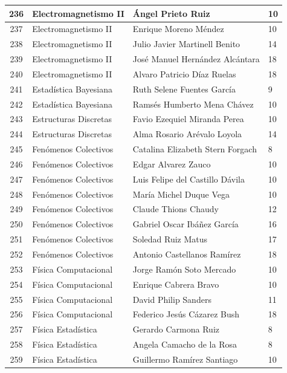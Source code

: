 {\begin{longtable}{|c|p{6.5cm}|p{5cm}|p{1.5cm}|}
  236 & Electromagnetismo II & Ángel Prieto Ruiz & 10 \\ \hline
  237 & Electromagnetismo II & Enrique Moreno Méndez & 10 \\ \hline
  238 & Electromagnetismo II & Julio Javier Martinell Benito & 14 \\ \hline
  239 & Electromagnetismo II & José Manuel Hernández Alcántara & 18 \\ \hline
  240 & Electromagnetismo II & Alvaro Patricio Díaz Ruelas & 18 \\ \hline
  241 & Estadística Bayesiana & Ruth Selene Fuentes García & 9 \\ \hline
  242 & Estadística Bayesiana & Ramsés Humberto Mena Chávez & 10 \\ \hline
  243 & Estructuras Discretas & Favio Ezequiel Miranda Perea & 10 \\ \hline
  244 & Estructuras Discretas & Alma Rosario Arévalo Loyola & 14 \\ \hline
  245 & Fenómenos Colectivos & Catalina Elizabeth Stern Forgach & 8 \\ \hline
  246 & Fenómenos Colectivos & Edgar Alvarez Zauco & 10 \\ \hline
  247 & Fenómenos Colectivos & Luis Felipe del Castillo Dávila & 10 \\ \hline
  248 & Fenómenos Colectivos & María Michel Duque Vega & 10 \\ \hline
  249 & Fenómenos Colectivos & Claude Thions Chaudy & 12 \\ \hline
  250 & Fenómenos Colectivos & Gabriel Oscar Ibáñez García & 16 \\ \hline
  251 & Fenómenos Colectivos & Soledad Ruiz Matus & 17 \\ \hline
  252 & Fenómenos Colectivos & Antonio Castellanos Ramírez & 18 \\ \hline
  253 & Física Computacional & Jorge Ramón Soto Mercado & 10 \\ \hline
  254 & Física Computacional & Enrique Cabrera Bravo & 10 \\ \hline
  255 & Física Computacional & David Philip Sanders & 11 \\ \hline
  256 & Física Computacional & Federico Jesús Cázarez Bush & 18 \\ \hline
  257 & Física Estadística & Gerardo Carmona Ruiz & 8 \\ \hline
  258 & Física Estadística & Angela Camacho de la Rosa & 8 \\ \hline
  259 & Física Estadística & Guillermo Ramírez Santiago & 10 \\ \hline

\end{longtable}}

